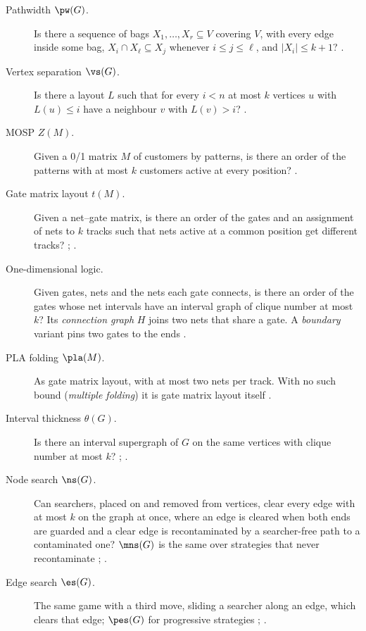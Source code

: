 \begin{description}
\item[Pathwidth $\pw(G)$.] Is there a sequence of bags $X_1,\dots,X_r\subseteq V$
  covering $V$, with every edge inside some bag, $X_i\cap X_\ell\subseteq X_j$
  whenever $i\le j\le\ell$, and $|X_i|\le k+1$? \citep[p.~346]{LY2002ref13}.
\item[Vertex separation $\vs(G)$.] Is there a layout $L$ such that for every
  $i<n$ at most $k$ vertices $u$ with $L(u)\le i$ have a neighbour $v$ with
  $L(v)>i$? \citep[p.~346]{LY2002ref13}.
\item[MOSP $Z(M)$.] Given a 0/1 matrix $M$ of customers by patterns, is there
  an order of the patterns with at most $k$ customers active at every position?
  \citep[eqs.~(1)--(2)]{LY2002}.
\item[Gate matrix layout $t(M)$.] Given a net--gate matrix, is there an order of
  the gates and an assignment of nets to $k$ tracks such that nets active at a
  common position get different tracks? \citep[p.~18]{LY2002ref6};
  \citep[Problem~1]{LY2002ref8}.
\item[One-dimensional logic.] Given gates, nets and the nets each gate connects,
  is there an order of the gates whose net intervals have an interval graph of
  clique number at most $k$? Its \emph{connection graph} $H$ joins two nets that
  share a gate. A \emph{boundary} variant pins two gates to the ends
  \citep[\S\S II--IV]{LY2002ref7}.
\item[PLA folding $\pla(M)$.] As gate matrix layout, with at most two nets per
  track. With no such bound (\emph{multiple folding}) it is gate matrix layout
  itself \citep[pp.~25, 36]{LY2002ref6}.
\item[Interval thickness $\theta(G)$.] Is there an interval supergraph of $G$ on
  the same vertices with clique number at most $k$?
  \citep[p.~182]{LY2002ref9}; \citep[p.~31]{LY2002ref6}.
\item[Node search $\ns(G)$.] Can searchers, placed on and removed from vertices,
  clear every edge with at most $k$ on the graph at once, where an edge is
  cleared when both ends are guarded and a clear edge is recontaminated by a
  searcher-free path to a contaminated one? $\mns(G)$ is the same over strategies
  that never recontaminate \citep[p.~181]{LY2002ref9}; \citep[\S2]{LY2002ref10}.
\item[Edge search $\es(G)$.] The same game with a third move, sliding a searcher
  along an edge, which clears that edge; $\pes(G)$ for progressive strategies
  \citep[p.~208]{LY2002ref10}; \citep[p.~53]{EllisSudboroughTurner1994}.

\end{description}
